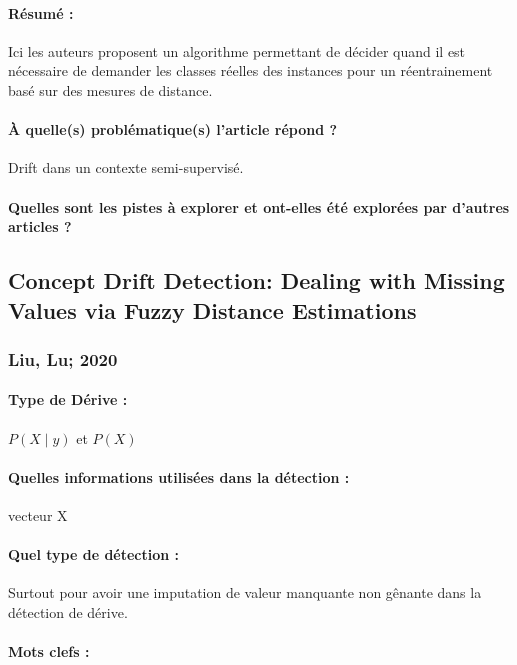 \documentclass[11pt,a4paper]{report}
\begin{document}
\paragraph{Résumé :} Ici les auteurs proposent un algorithme permettant de décider quand il est nécessaire de demander les classes réelles des instances pour un réentrainement basé sur des mesures de distance.

\paragraph{À quelle(s) problématique(s) l'article répond ?} Drift dans un contexte semi-supervisé.

\paragraph{Quelles sont les pistes à explorer et ont-elles  été explorées par d'autres articles ?}








\subsection{Concept Drift Detection: Dealing with Missing Values via Fuzzy Distance Estimations}
\subsubsection{Liu, Lu; 2020}

\paragraph{Type de Dérive :} $P(X\mid y)$ et $P(X)$
\paragraph{Quelles informations utilisées dans la détection :} vecteur X
\paragraph{Quel type de détection :} Surtout pour avoir une imputation de valeur manquante non gênante dans la détection de dérive.

\paragraph{Mots clefs :} 
\end{document}
